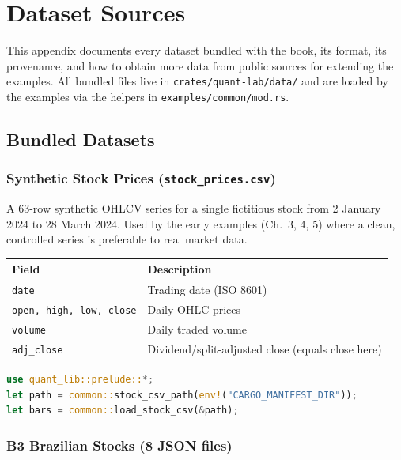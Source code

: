 \chapter{Dataset Sources}
\label{app:datasets}

This appendix documents every dataset bundled with the book, its
format, its provenance, and how to obtain more data from public
sources for extending the examples. All bundled files live in
\texttt{crates/quant-lab/data/} and are loaded by the
 examples via the helpers in
\texttt{examples/common/mod.rs}.

\section{Bundled Datasets}

\subsection{Synthetic Stock Prices (\texttt{stock\_prices.csv})}

A 63-row synthetic OHLCV series for a single fictitious stock from
2 January 2024 to 28 March 2024. Used by the early examples (Ch.~3, 4,
5) where a clean, controlled series is preferable to real market data.

\begin{center}
\begin{tabular}{ll}
\toprule
\textbf{Field} & \textbf{Description} \\
\midrule
\texttt{date} & Trading date (ISO 8601) \\
\texttt{open, high, low, close} & Daily OHLC prices \\
\texttt{volume} & Daily traded volume \\
\texttt{adj\_close} & Dividend/split-adjusted close (equals close here) \\
\bottomrule
\end{tabular}
\end{center}

\begin{lstlisting}[language=Rust]
use quant_lib::prelude::*;
let path = common::stock_csv_path(env!("CARGO_MANIFEST_DIR"));
let bars = common::load_stock_csv(&path);
\end{lstlisting}

\subsection{B3 Brazilian Stocks (8 JSON files)}

